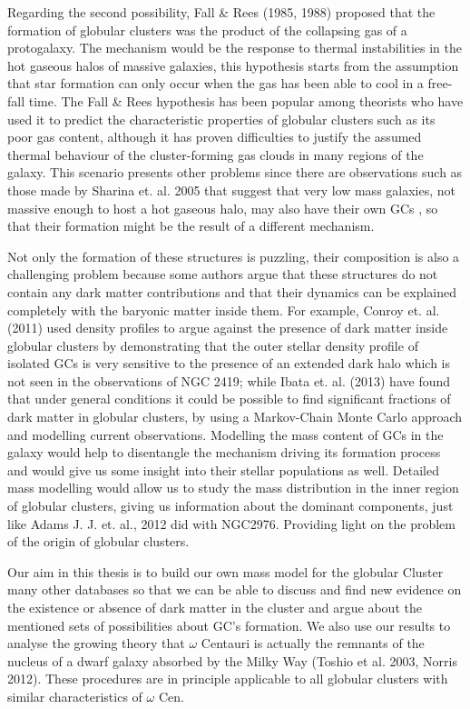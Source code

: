 Regarding the second possibility, Fall \& Rees (1985, 1988) proposed that the formation of globular clusters was the product of the collapsing gas of a protogalaxy. The mechanism would be the response to thermal instabilities in the hot gaseous halos of massive galaxies, this hypothesis starts from the assumption that star formation can only occur when the gas has been able to cool in a free-fall time. The Fall \& Rees hypothesis has been popular among theorists who have used it to predict the characteristic properties of globular clusters such as its poor gas content, although it has proven difficulties to justify the assumed thermal behaviour of the cluster-forming gas clouds in many regions of the galaxy. This scenario presents other problems since there are observations such as those made by Sharina et. al. 2005 that suggest that very low mass galaxies, not massive enough to host a hot gaseous halo, may also have their own GCs , so that their formation might be the result of a different mechanism.

Not only the formation of these structures is puzzling, their composition is also a challenging problem because some authors argue that these structures do not contain any dark matter contributions and that their dynamics can be explained completely with the baryonic matter inside them. For example, Conroy et. al. (2011) used density profiles to argue against the presence of dark matter inside globular clusters by demonstrating that the outer stellar density profile of isolated GCs is
very sensitive to the presence of an extended dark halo which is not seen in the observations of NGC 2419; while Ibata et. al. (2013) have found that under general conditions it could be possible to find significant fractions of dark matter in globular clusters, by using a Markov-Chain Monte Carlo approach and modelling current observations. Modelling the mass content of GCs in the galaxy would help to disentangle the mechanism driving its formation process and would give us some insight into their stellar populations as well. Detailed mass modelling would allow us to study the mass distribution in the inner region of globular clusters, giving us information about the dominant components, just like Adams J. J. et. al., 2012 did with NGC2976. Providing light on the problem of the origin of globular clusters.

Our aim in this thesis is to build our own mass model for the globular Cluster many other databases so that we can be able to discuss and find new evidence on the existence or absence of dark matter in the cluster and argue about the mentioned sets of possibilities about GC's formation. We also use our results to analyse the growing theory that $\omega$ Centauri is actually the remnants of the nucleus of a dwarf galaxy absorbed by the Milky Way (Toshio et al. 2003, Norris 2012). These procedures are in principle applicable to all globular clusters with similar characteristics of $\omega$ Cen. 

